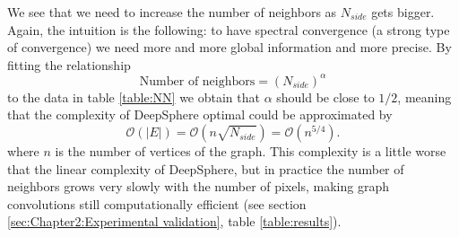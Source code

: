 We see that we need to increase the number of neighbors as $N_{side}$ gets bigger. Again, the intuition is the following: to have spectral convergence (a strong type of convergence) we need more and more global information and more precise. By fitting the relationship
$$
\text{Number of neighbors} = (N_{side})^\alpha
$$
to the data in table \ref{table:NN} we obtain that $\alpha$ should be close to $1/2$, meaning that the complexity of DeepSphere optimal could be approximated by
$$
\mathcal O(|E|) = \mathcal O(n\sqrt{N_{side}})  = \mathcal{O}(n^{5/4}).
$$
where $n$ is the number of vertices of the graph. This complexity is a little worse that the linear complexity of DeepSphere, but in practice the number of neighbors grows very slowly with the number of pixels, making graph convolutions still computationally efficient (see section \ref{sec:Chapter2:Experimental validation}, table \ref{table:results}). 

